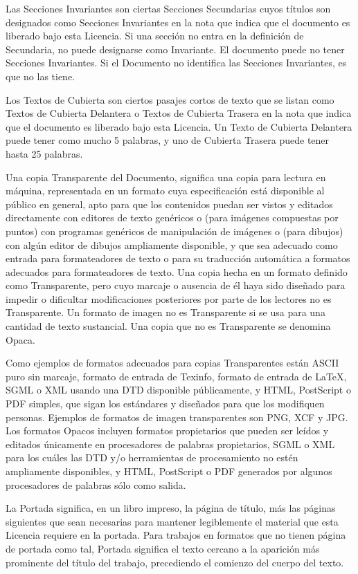 Las Secciones Invariantes son ciertas Secciones Secundarias cuyos
títulos son designados como Secciones Invariantes en la nota que
indica que el documento es liberado bajo esta Licencia. Si una sección
no entra en la definición de Secundaria, no puede designarse como
Invariante. El documento puede no tener Secciones Invariantes. Si el
Documento no identifica las Secciones Invariantes, es que no las
tiene.

Los Textos de Cubierta son ciertos pasajes cortos de texto que se
listan como Textos de Cubierta Delantera o Textos de Cubierta Trasera
en la nota que indica que el documento es liberado bajo esta Licencia.
Un Texto de Cubierta Delantera puede tener como mucho 5 palabras, y
uno de Cubierta Trasera puede tener hasta 25 palabras.

Una copia Transparente del Documento, significa una copia para lectura
en máquina, representada en un formato cuya especificación está
disponible al público en general, apto para que los contenidos puedan
ser vistos y editados directamente con editores de texto genéricos o
(para imágenes compuestas por puntos) con programas genéricos de
manipulación de imágenes o (para dibujos) con algún editor de dibujos
ampliamente disponible, y que sea adecuado como entrada para
formateadores de texto o para su traducción automática a formatos
adecuados para formateadores de texto. Una copia hecha en un formato
definido como Transparente, pero cuyo marcaje o ausencia de él haya
sido diseñado para impedir o dificultar modificaciones posteriores por
parte de los lectores no es Transparente. Un formato de imagen no es
Transparente si se usa para una cantidad de texto sustancial. Una
copia que no es Transparente se denomina Opaca.

Como ejemplos de formatos adecuados para copias Transparentes están
ASCII puro sin marcaje, formato de entrada de Texinfo, formato de
entrada de LaTeX, SGML o XML usando una DTD disponible públicamente, y
HTML, PostScript o PDF simples, que sigan los estándares y diseñados
para que los modifiquen personas. Ejemplos de formatos de imagen
transparentes son PNG, XCF y JPG. Los formatos Opacos incluyen
formatos propietarios que pueden ser leídos y editados únicamente en
procesadores de palabras propietarios, SGML o XML para los cuáles las
DTD y/o herramientas de procesamiento no estén ampliamente
disponibles, y HTML, PostScript o PDF generados por algunos
procesadores de palabras sólo como salida.

La Portada significa, en un libro impreso, la página de título, más
las páginas siguientes que sean necesarias para mantener legiblemente
el material que esta Licencia requiere en la portada. Para trabajos en
formatos que no tienen página de portada como tal, Portada significa
el texto cercano a la aparición más prominente del título del trabajo,
precediendo el comienzo del cuerpo del texto.

